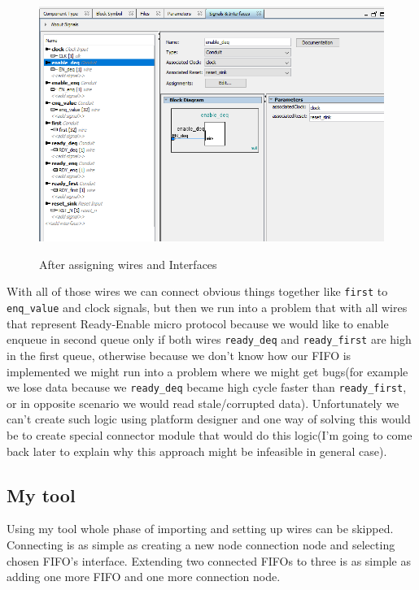 \documentclass[12pt]{report}
\begin{document}
\begin{figure}
    \caption{After assigning wires and Interfaces}
    \includegraphics[width=\textwidth]{images/Example1AfterOrganization.png} \\
    \centering
\end{figure}

With all of those wires we can connect obvious things together like \verb!first! to \verb!enq_value! and clock signals, but then we run into a problem that with all wires that represent Ready-Enable micro protocol because we would like to enable enqueue in second queue only if both wires \verb!ready_deq! and \verb!ready_first! are high in the first queue, otherwise because we don't know how our FIFO is implemented we might run into a problem where we might get bugs(for example we lose data because we \verb!ready_deq! became high cycle faster than \verb!ready_first!, or in opposite scenario we would read stale/corrupted data). Unfortunately we can't create such logic using platform designer and one way of solving this would be to create special connector module that would do this logic(I'm going to come back later to explain why this approach might be infeasible in general case). 

\subsection{My tool}
Using my tool whole phase of importing and setting up wires can be skipped. Connecting is as simple as creating a new node connection node and selecting chosen FIFO's interface. Extending two connected FIFOs to three is as simple as adding one more FIFO and one more connection node.
\end{document}
